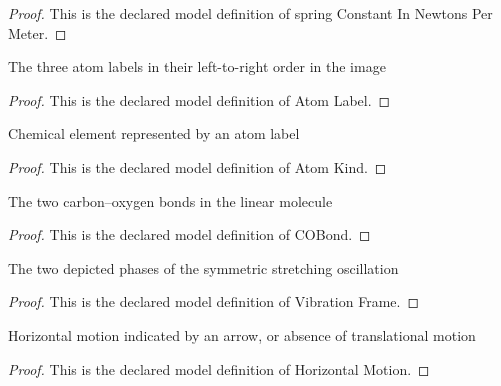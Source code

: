 \begin{proof}
  This is the declared model definition of spring Constant In Newtons Per Meter.
\end{proof}
\begin{definition}
  \label{def:physics:phyx-mini-0207:phyxminiproblems-problemphyxmini0207-atomlabel}
  The three atom labels in their left-to-right order in the image
\end{definition}
\begin{proof}
  This is the declared model definition of Atom Label.
\end{proof}
\begin{definition}
  \label{def:physics:phyx-mini-0207:phyxminiproblems-problemphyxmini0207-atomkind}
  Chemical element represented by an atom label
\end{definition}
\begin{proof}
  This is the declared model definition of Atom Kind.
\end{proof}
\begin{definition}[COBond]
  \label{def:physics:phyx-mini-0207:phyxminiproblems-problemphyxmini0207-cobond}
  The two carbon--oxygen bonds in the linear molecule
\end{definition}
\begin{proof}
  This is the declared model definition of COBond.
\end{proof}
\begin{definition}
  \label{def:physics:phyx-mini-0207:phyxminiproblems-problemphyxmini0207-vibrationframe}
  The two depicted phases of the symmetric stretching oscillation
\end{definition}
\begin{proof}
  This is the declared model definition of Vibration Frame.
\end{proof}
\begin{definition}
  \label{def:physics:phyx-mini-0207:phyxminiproblems-problemphyxmini0207-horizontalmotion}
  Horizontal motion indicated by an arrow, or absence of translational motion
\end{definition}
\begin{proof}
  This is the declared model definition of Horizontal Motion.
\end{proof}
